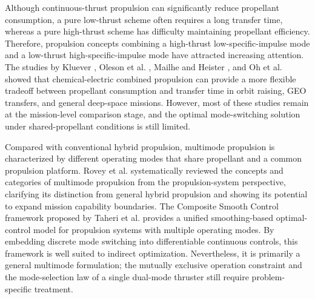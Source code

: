 \documentclass{IEEEtaes}
\begin{document}
Although continuous-thrust propulsion can significantly reduce propellant consumption, a pure low-thrust scheme often requires a long transfer time, whereas a pure high-thrust scheme has difficulty maintaining propellant efficiency. Therefore, propulsion concepts combining a high-thrust low-specific-impulse mode and a low-thrust high-specific-impulse mode have attracted increasing attention. The studies by Kluever \cite{kluever1995,kluever2012}, Oleson et al. \cite{oleson1997}, Mailhe and Heister \cite{mailhe2002}, and Oh et al. \cite{oh2004} showed that chemical-electric combined propulsion can provide a more flexible tradeoff between propellant consumption and transfer time in orbit raising, GEO transfers, and general deep-space missions. However, most of these studies remain at the mission-level comparison stage, and the optimal mode-switching solution under shared-propellant conditions is still limited.

Compared with conventional hybrid propulsion, multimode propulsion is characterized by different operating modes that share propellant and a common propulsion platform. Rovey et al. \cite{rovey2020} systematically reviewed the concepts and categories of multimode propulsion from the propulsion-system perspective, clarifying its distinction from general hybrid propulsion and showing its potential to expand mission capability boundaries. The Composite Smooth Control framework proposed by Taheri et al. \cite{taheri2020a,taheri2020b} provides a unified smoothing-based optimal-control model for propulsion systems with multiple operating modes. By embedding discrete mode switching into differentiable continuous controls, this framework is well suited to indirect optimization. Nevertheless, it is primarily a general multimode formulation; the mutually exclusive operation constraint and the mode-selection law of a single dual-mode thruster still require problem-specific treatment.
\end{document}
